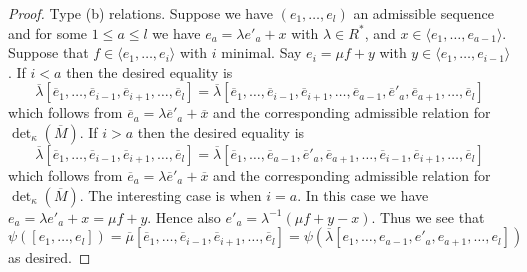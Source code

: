 \begin{proof}
\medskip\noindent
Type (b) relations. Suppose we have $(e_1, \ldots, e_l)$ an
admissible sequence and for some $1 \leq a \leq l$ we have
$e_a = \lambda e'_a + x$ with $\lambda \in R^*$, and
$x \in \langle e_1, \ldots, e_{a - 1}\rangle$.
Suppose that $f \in \langle e_1, \ldots, e_i\rangle$ with $i$ minimal.
Say $e_i = \mu f + y$ with $y \in \langle e_1, \ldots, e_{i - 1}\rangle$.
If $i < a$ then the desired equality is 
$$
\overline{\lambda}
[\overline{e}_1,
\ldots,
\overline{e}_{i - 1},
\overline{e}_{i + 1},
\ldots,
\overline{e}_l]
=
\overline{\lambda}
[\overline{e}_1,
\ldots,
\overline{e}_{i - 1},
\overline{e}_{i + 1},
\ldots,
\overline{e}_{a - 1},
\overline{e}'_a,
\overline{e}_{a + 1},
\ldots,
\overline{e}_l]
$$
which follows from $\overline{e}_a = \lambda \overline{e}'_a + \overline{x}$
and the corresponding admissible relation for $\det_\kappa(\overline{M})$.
If $i > a$ then the desired equality is 
$$
\overline{\lambda}
[\overline{e}_1,
\ldots,
\overline{e}_{i - 1},
\overline{e}_{i + 1},
\ldots,
\overline{e}_l]
=
\overline{\lambda}
[\overline{e}_1,
\ldots,
\overline{e}_{a - 1},
\overline{e}'_a,
\overline{e}_{a + 1},
\ldots,
\overline{e}_{i - 1},
\overline{e}_{i + 1},
\ldots,
\overline{e}_l]
$$
which follows from $\overline{e}_a = \lambda \overline{e}'_a + \overline{x}$
and the corresponding admissible relation for $\det_\kappa(\overline{M})$.
The interesting case is when $i = a$. In this case we have
$e_a = \lambda e'_a + x = \mu f + y$. Hence also
$e'_a = \lambda^{-1}(\mu f + y - x)$. Thus we see that
$$
\psi([e_1, \ldots, e_l])
= \overline{\mu}
[\overline{e}_1, \ldots,
\overline{e}_{i - 1},
\overline{e}_{i + 1}, \ldots, \overline{e}_l]
=
\psi(
\overline{\lambda}
[e_1, \ldots, e_{a - 1}, e'_a, e_{a + 1}, \ldots, e_l]
)
$$
as desired.


\end{proof}
